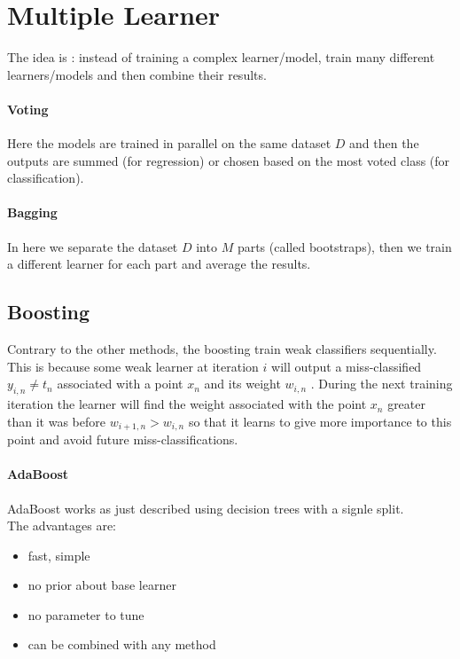 \section{Multiple Learner}
The idea is : instead of training a complex learner/model, train many different learners/models and then combine their results.

\paragraph{Voting}
Here the models are trained in parallel on the same dataset $D$ and then  the outputs are summed (for regression) or chosen based on the most voted class (for classification).

\paragraph{Bagging}
In here we separate the dataset $D$ into $M$ parts (called bootstraps), then we train a different learner for each part and average the results.

\subsection{Boosting}
Contrary to the other methods, the boosting train weak classifiers sequentially. This is because some weak learner at iteration $i$ will output a miss-classified $y_{i,n} \ne t_n$ associated with a point $x_n$ and its weight $w_{i,n}$ . During the next training iteration the learner will find the weight associated with the point $x_n$  greater than it was before $w_{i+1,n} >w_{i,n}$ so that  it learns to give more importance to this point and avoid future miss-classifications.

\paragraph{AdaBoost}
AdaBoost works as just described using decision trees with a signle split.\\

The advantages are:
\begin{itemize}
\item fast, simple
\item no prior  about base learner
\item no parameter to tune
\item can be combined with any method
\end{itemize}

